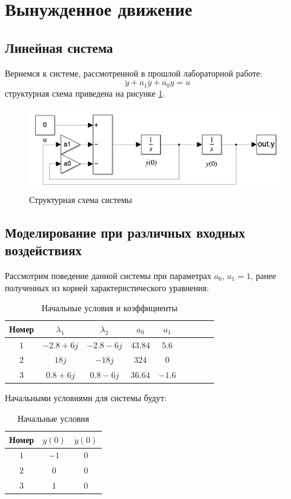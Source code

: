 \section{Вынужденное движение}
\subsection{Линейная система}
Вернемся к системе, рассмотренной в прошлой лабораторной работе:
\begin{equation}
    \ddot{y} + a_1 \dot{y} + a_0 y = u
    \label{eq:system}
\end{equation}
структурная схема приведена на рисунке \ref{fig:scheme1}.
\begin{figure}[ht!]
    \centering
    \includegraphics[width=\textwidth]{media/scheme1.png}
    \caption{Структурная схема системы}
    \label{fig:scheme1}
\end{figure}

\subsection{Моделирование при различных входных воздействиях}
Рассмотрим поведение данной системы при параметрах $a_0$, $a_1 = 1$, 
ранее полученных из корней характеристического уравнения: 
\begin{table}[ht!]
    \centering
    \begin{tabular}{|c|c|c|c|c|c|c|c|c|}
        \hline
        Номер & $\lambda_1$ & $\lambda_2$ & $a_0$ & $a_1$ \\
        \hline
        $1$ & $-2.8 + 6j$ & $-2.8 - 6j$ & $43.84$ & $5.6$ \\
        \hline
        $2$ & $18j$ & $-18j$ & $324$ & $0$ \\
        \hline
        $3$ & $0.8 + 6j$ & $0.8 - 6j$ & $36.64$ &  $-1.6$ \\
        \hline
    \end{tabular}
    \caption{Начальные условия и коэффициенты}
    \label{tab:initial_conditions}
\end{table}
Начальными условиями для системы будут:
\begin{table}[ht!]
    \centering
    \begin{tabular}{|c|c|c|}
        \hline 
        Номер & $y(0)$ & $\dot{y}(0)$ \\
        \hline
        $1$ & $-1$ & $0$ \\
        \hline
        $2$ & $0$ & $0$ \\
        \hline
        $3$ & $1$ & $0$ \\
        \hline
    \end{tabular}
    \caption{Начальные условия}
\end{table}

